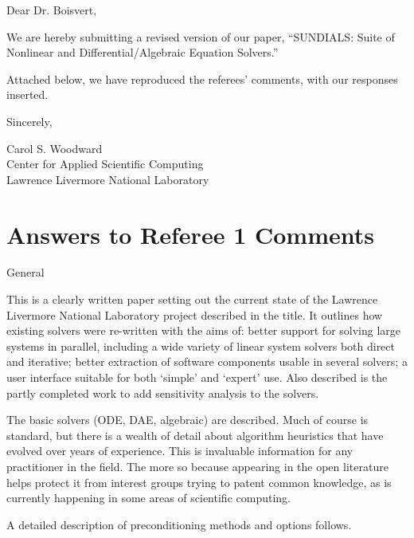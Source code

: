 \batchmode

\setlength{\textheight}{9.0in}
\setlength{\topmargin}{-0.4in}


\begin{letter}



\opening{Dear Dr. Boisvert,}

We are hereby submitting a revised version of our paper, ``SUNDIALS:
Suite of Nonlinear and Differential/Algebraic Equation Solvers.''

Attached below, we have reproduced the referees' comments, with our
responses inserted.

\closing{Sincerely,}

Carol S. Woodward\\
Center for Applied Scientific Computing\\
Lawrence Livermore National Laboratory

\end{letter}


\newpage
\section{Answers to Referee 1 Comments}

General 

This is a clearly written paper setting out the current state of the
Lawrence Livermore National Laboratory project described in the title.
It outlines how existing solvers were re-written with the aims of:
better support for solving large systems in parallel, including a wide
variety of linear system solvers both direct and iterative; better
extraction of software components usable in several solvers; a user
interface suitable for both `simple' and `expert' use. Also described
is the partly completed work to add sensitivity analysis to the
solvers. 

The basic solvers (ODE, DAE, algebraic) are described.  Much of course
is standard, but there is a wealth of detail about algorithm
heuristics that have evolved over years of experience. This is
invaluable information for any practitioner in the field. The more so
because appearing in the open literature helps protect it from
interest groups trying to patent common knowledge, as is currently
happening in some areas of scientific computing.

A detailed description of preconditioning methods and options follows. 

